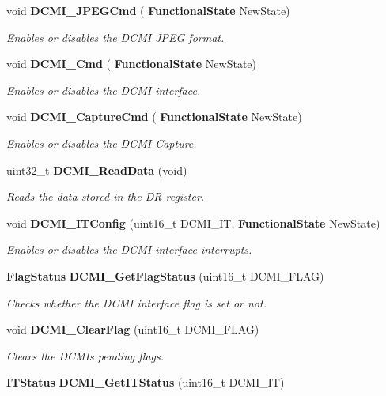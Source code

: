 \begin{DoxyCompactItemize}
void \textbf{ D\+C\+M\+I\+\_\+\+J\+P\+E\+G\+Cmd} (\textbf{ Functional\+State} New\+State)
\begin{DoxyCompactList}\small\item\em Enables or disables the D\+C\+MI J\+P\+EG format. \end{DoxyCompactList}\item 
void \textbf{ D\+C\+M\+I\+\_\+\+Cmd} (\textbf{ Functional\+State} New\+State)
\begin{DoxyCompactList}\small\item\em Enables or disables the D\+C\+MI interface. \end{DoxyCompactList}\item 
void \textbf{ D\+C\+M\+I\+\_\+\+Capture\+Cmd} (\textbf{ Functional\+State} New\+State)
\begin{DoxyCompactList}\small\item\em Enables or disables the D\+C\+MI Capture. \end{DoxyCompactList}\item 
uint32\+\_\+t \textbf{ D\+C\+M\+I\+\_\+\+Read\+Data} (void)
\begin{DoxyCompactList}\small\item\em Reads the data stored in the DR register. \end{DoxyCompactList}\item 
void \textbf{ D\+C\+M\+I\+\_\+\+I\+T\+Config} (uint16\+\_\+t D\+C\+M\+I\+\_\+\+IT, \textbf{ Functional\+State} New\+State)
\begin{DoxyCompactList}\small\item\em Enables or disables the D\+C\+MI interface interrupts. \end{DoxyCompactList}\item 
\textbf{ Flag\+Status} \textbf{ D\+C\+M\+I\+\_\+\+Get\+Flag\+Status} (uint16\+\_\+t D\+C\+M\+I\+\_\+\+F\+L\+AG)
\begin{DoxyCompactList}\small\item\em Checks whether the D\+C\+MI interface flag is set or not. \end{DoxyCompactList}\item 
void \textbf{ D\+C\+M\+I\+\_\+\+Clear\+Flag} (uint16\+\_\+t D\+C\+M\+I\+\_\+\+F\+L\+AG)
\begin{DoxyCompactList}\small\item\em Clears the D\+C\+MI\textquotesingle{}s pending flags. \end{DoxyCompactList}\item 
\textbf{ I\+T\+Status} \textbf{ D\+C\+M\+I\+\_\+\+Get\+I\+T\+Status} (uint16\+\_\+t D\+C\+M\+I\+\_\+\+IT)

\end{DoxyCompactItemize}
